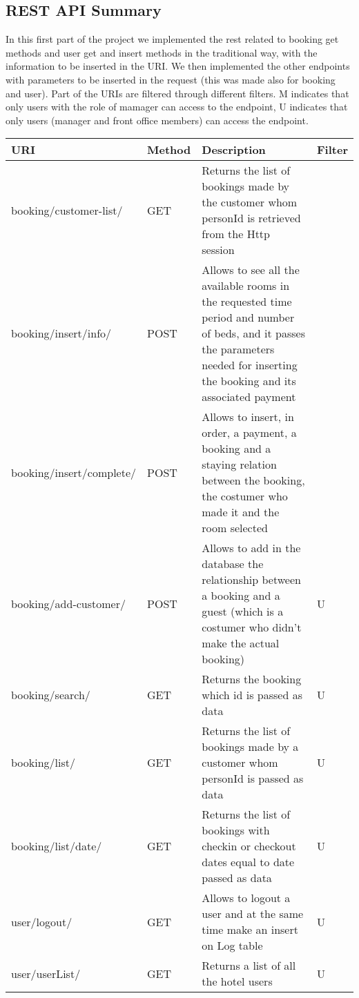 \subsection{REST API Summary}

In this first part of the project we implemented the rest related to booking get methods and user get and insert methods in the traditional way, with the information to be inserted in the URI.
We then implemented the other endpoints with parameters to be inserted in the request (this was made also for booking and user).
Part of the URIs are filtered through different filters. M indicates that only users with the role of mamager can access to the endpoint, U indicates that only users (manager and front office members) can access the endpoint.

\begin{longtable}{|p{}|p{} |p{}|p{}|}
\hline
\textbf{URI} & \textbf{Method} & \textbf{Description} & \textbf{Filter} \\\hline
booking/customer-list/ & GET & Returns the list of bookings made by the customer whom personId is retrieved from the Http session & \\\hline
booking/insert/info/ & POST & Allows to see all the available rooms in the requested time period and number of beds, and it passes the parameters needed for inserting the booking and its associated payment & \\\hline
booking/insert/complete/ & POST & Allows to insert, in order, a payment, a booking and a staying relation between the booking, the costumer who made it and the room selected & \\\hline
booking/add-customer/ & POST & Allows to add in the database the relationship between a booking and a guest (which is a costumer who didn't make the actual booking) & U \\\hline
booking/search/ & GET & Returns the booking which id is passed as data & U \\\hline
booking/list/ & GET & Returns the list of bookings made by a customer whom personId is passed as data & U \\\hline
booking/list/date/ & GET & Returns the list of bookings with checkin or checkout dates equal to date passed as data & U \\\hline
user/logout/ & GET & Allows to logout a user and at the same time make an insert on Log table & U \\\hline
user/userList/ & GET & Returns a list of all the hotel users & U \\\hline

\end{longtable}
